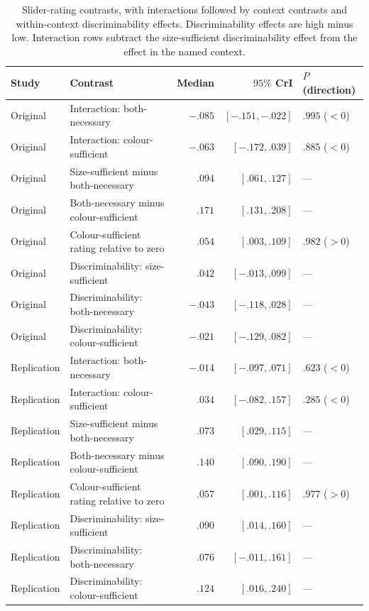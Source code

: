 \documentclass[10pt,a4paper,fleqn]{article}
\begin{document}
\begin{table}[!htbp]
\centering
\small
\caption{Slider-rating contrasts, with interactions followed by context contrasts and within-context discriminability effects.
Discriminability effects are high minus low.
Interaction rows subtract the size-sufficient discriminability effect from the effect in the named context.}
\label{tab:slider-behavioural-contrasts}
\begin{tabularx}{\textwidth}{l X r r l}
\toprule
Study & Contrast & Median & $95\%$ CrI & $P$ (direction) \\
\midrule
Original & Interaction: both-necessary & $-.085$ & $[-.151,-.022]$ & $.995$ ($<0$) \\
Original & Interaction: colour-sufficient & $-.063$ & $[-.172,.039]$ & $.885$ ($<0$) \\
Original & Size-sufficient minus both-necessary & $.094$ & $[.061,.127]$ & --- \\
Original & Both-necessary minus colour-sufficient & $.171$ & $[.131,.208]$ & --- \\
Original & Colour-sufficient rating relative to zero & $.054$ & $[.003,.109]$ & $.982$ ($>0$) \\
Original & Discriminability: size-sufficient & $.042$ & $[-.013,.099]$ & --- \\
Original & Discriminability: both-necessary & $-.043$ & $[-.118,.028]$ & --- \\
Original & Discriminability: colour-sufficient & $-.021$ & $[-.129,.082]$ & --- \\
\midrule
Replication & Interaction: both-necessary & $-.014$ & $[-.097,.071]$ & $.623$ ($<0$) \\
Replication & Interaction: colour-sufficient & $.034$ & $[-.082,.157]$ & $.285$ ($<0$) \\
Replication & Size-sufficient minus both-necessary & $.073$ & $[.029,.115]$ & --- \\
Replication & Both-necessary minus colour-sufficient & $.140$ & $[.090,.190]$ & --- \\
Replication & Colour-sufficient rating relative to zero & $.057$ & $[.001,.116]$ & $.977$ ($>0$) \\
Replication & Discriminability: size-sufficient & $.090$ & $[.014,.160]$ & --- \\
Replication & Discriminability: both-necessary & $.076$ & $[-.011,.161]$ & --- \\
Replication & Discriminability: colour-sufficient & $.124$ & $[.016,.240]$ & --- \\
\bottomrule
\end{tabularx}
\end{table}
\end{document}

